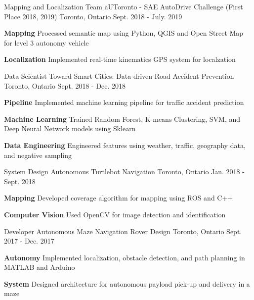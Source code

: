 \begin{cventries}
	\cventry
	{Mapping and Localization Team}
	{aUToronto - SAE AutoDrive Challenge (First Place 2018, 2019)}
	{Toronto, Ontario}
	{Sept. 2018 - July. 2019}
	{
		\begin{cvitems}
			\item {\textbf{Mapping} Processed semantic map using Python, QGIS and Open Street Map for level 3 autonomy vehicle}
			\item {\textbf{Localization} Implemented real-time kinematics GPS system for localzation}
		\end{cvitems}
	}	
	\cventry
	{Data Scientist}
	{Toward Smart Cities: Data-driven Road Accident Prevention}
	{Toronto, Ontario}
	{Sept. 2018 - Dec. 2018}
	{
		\begin{cvitems}
			\item {\textbf{Pipeline} Implemented machine learning pipeline for traffic accident prediction}
			\item {\textbf{Machine Learning} Trained Random Forest, K-means Clustering, SVM, and Deep Neural Network models using Sklearn}
			\item {\textbf{Data Engineering} Engineered features using weather, traffic, geography data, and negative sampling}
		\end{cvitems}
	}
	\cventry
	{System Design}
	{Autonomous Turtlebot Navigation}
	{Toronto, Ontario}
	{Jan. 2018 - Sept. 2018}
	{
		\begin{cvitems}
			\item {\textbf{Mapping} Developed coverage algorithm for mapping using ROS and C++}
			\item {\textbf{Computer Vision} Used OpenCV for image detection and identification}
		\end{cvitems}
	}
	\cventry
	{Developer}
	{Autonomous Maze Navigation Rover Design}
	{Toronto, Ontario}
	{Sept. 2017 - Dec. 2017}
	{
		\begin{cvitems}
			\item { \textbf{Autonomy} Implemented localization, obstacle detection, and path planning in MATLAB and Arduino}
			\item { \textbf{System} Designed architecture for autonomous payload pick-up and delivery in a maze}
		\end{cvitems}
	}
\end{cventries}

